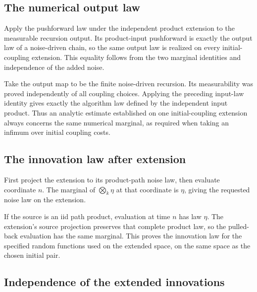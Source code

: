 \documentclass[11pt,a4paper]{report}
\begin{document}
\subsection{\texorpdfstring{The numerical output law}{The numerical output law}}
\label{report-step-UnadjustedLangevin-InitialExtension-lean-11}


Apply the pushforward law under the independent product extension to the measurable recursion output. Its product-input pushforward is exactly the output law of a noise-driven chain, so the same output law is realized on every initial-coupling extension. This equality follows from the two marginal identities and independence of the added noise.



Take the output map to be the finite noise-driven recursion. Its measurability was proved independently of all coupling choices. Applying the preceding input-law identity gives exactly the algorithm law defined by the independent input product. Thus an analytic estimate established on one initial-coupling extension always concerns the same numerical marginal, as required when taking an infimum over initial coupling costs.

\subsection{\texorpdfstring{The innovation law after extension}{The innovation law after extension}}
\label{report-step-UnadjustedLangevin-InitialExtension-lean-12}


First project the extension to its product-path noise law, then evaluate coordinate \(n\). The marginal of \(\bigotimes_k\eta\) at that coordinate is \(\eta\), giving the requested noise law on the extension.



If the source is an iid path product, evaluation at time \(n\) has law \(\eta\). The extension's source projection preserves that complete product law, so the pulled-back evaluation has the same marginal. This proves the innovation law for the specified random functions used on the extended space, on the same space as the chosen initial pair.

\subsection{\texorpdfstring{Independence of the extended innovations}{Independence of the extended innovations}}
\label{report-step-UnadjustedLangevin-InitialExtension-lean-13}
\end{document}
